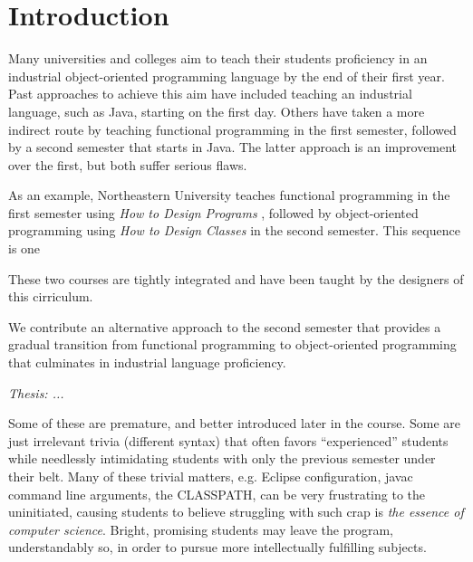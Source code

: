 \documentclass[submission,copyright]{eptcs}
\title{\thetitle}
\author{Sam Tobin-Hochstadt \quad\qquad David Van Horn
\institute{Northeastern University\\
Boston, Massachusetts, USA}
\email{\{samth,dvanhorn\}@ccs.neu.edu}
}
\begin{document}
\maketitle

\begin{abstract}
We propose a bridge between functional and object-oriented programming
in the first-year cirriculum.
\end{abstract}

\section{Introduction}

Many universities and colleges aim to teach their students proficiency
in an industrial object-oriented programming language by the end of
their first year.  Past approaches to achieve this aim have included
teaching an industrial language, such as Java, starting on the first
day.  Others have taken a more indirect route by teaching functional
programming in the first semester, followed by a second semester that
starts in Java.  The latter approach is an improvement over the first,
but both suffer serious flaws.

As an example, Northeastern University teaches functional programming
in the first semester using \emph{How to Design Programs}
\cite{dvanhorn:Felleisen2001How}, followed by object-oriented
programming using \emph{How to Design Classes} \cite{local:htdc} in
the second semester.  This sequence is one 


These two courses are tightly integrated
and have been taught by the designers of this cirriculum.


We contribute an alternative approach to the second semester that
provides a gradual transition from functional programming to
object-oriented programming that culminates in industrial language
proficiency.

\emph{Thesis: ...}

\cite{local:dpc}

Some of these are premature, and better introduced later in the
course.  Some are just irrelevant trivia (different syntax) that often
favors ``experienced'' students while needlessly intimidating students
with only the previous semester under their belt.  Many of these
trivial matters, e.g. Eclipse configuration, javac command line
arguments, the CLASSPATH, can be very frustrating to the uninitiated,
causing students to believe struggling with such crap is \emph{the
  essence of computer science}.  Bright, promising students may leave
the program, understandably so, in order to pursue more intellectually
fulfilling subjects.
\end{document}
